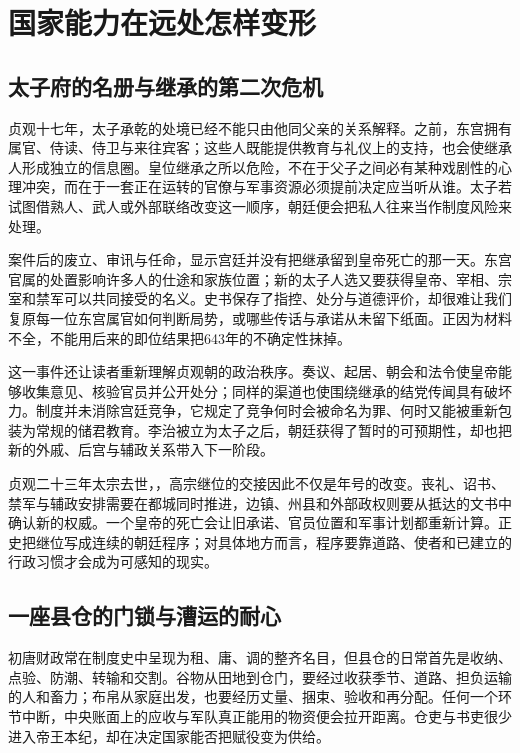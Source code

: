 \section{国家能力在远处怎样变形}
\label{sec:early-tang-acceptance-scenes-two}

\subsection{太子府的名册与继承的第二次危机}
贞观十七年，太子承乾的处境已经不能只由他同父亲的关系解释。之前，东宫拥有属官、侍读、侍卫与来往宾客；这些人既能提供教育与礼仪上的支持，也会使继承人形成独立的信息圈。皇位继承之所以危险，不在于父子之间必有某种戏剧性的心理冲突，而在于一套正在运转的官僚与军事资源必须提前决定应当听从谁。太子若试图借熟人、武人或外部联络改变这一顺序，朝廷便会把私人往来当作制度风险来处理。

案件后的废立、审讯与任命，显示宫廷并没有把继承留到皇帝死亡的那一天。东宫官属的处置影响许多人的仕途和家族位置；新的太子人选又要获得皇帝、宰相、宗室和禁军可以共同接受的名义。史书保存了指控、处分与道德评价，却很难让我们复原每一位东宫属官如何判断局势，或哪些传话与承诺从未留下纸面。正因为材料不全，不能用后来的即位结果把643年的不确定性抹掉。

这一事件还让读者重新理解贞观朝的政治秩序。奏议、起居、朝会和法令使皇帝能够收集意见、核验官员并公开处分；同样的渠道也使围绕继承的结党传闻具有破坏力。制度并未消除宫廷竞争，它规定了竞争何时会被命名为罪、何时又能被重新包装为常规的储君教育。李治被立为太子之后，朝廷获得了暂时的可预期性，却也把新的外戚、后宫与辅政关系带入下一阶段。

贞观二十三年太宗去世，，高宗继位的交接因此不仅是年号的改变。丧礼、诏书、禁军与辅政安排需要在都城同时推进，边镇、州县和外部政权则要从抵达的文书中确认新的权威。一个皇帝的死亡会让旧承诺、官员位置和军事计划都重新计算。正史把继位写成连续的朝廷程序；对具体地方而言，程序要靠道路、使者和已建立的行政习惯才会成为可感知的现实。

\subsection{一座县仓的门锁与漕运的耐心}
初唐财政常在制度史中呈现为租、庸、调的整齐名目，但县仓的日常首先是收纳、点验、防潮、转输和交割。谷物从田地到仓门，要经过收获季节、道路、担负运输的人和畜力；布帛从家庭出发，也要经历丈量、捆束、验收和再分配。任何一个环节中断，中央账面上的应收与军队真正能用的物资便会拉开距离。仓吏与书吏很少进入帝王本纪，却在决定国家能否把赋役变为供给。

